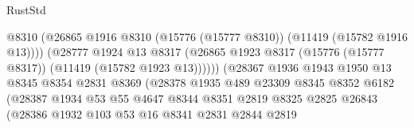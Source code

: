 \begin{lexlean}{RustStd}
\begin{coremodule}
                                            @8310
                                            (@26865
                                              @1916
                                              @8310
                                              (@15776 (@15777 @8310))
                                              (@11419 (@15782 @1916 @13))))
                                          (@28777
                                            @1924
                                            @13
                                            @8317
                                            (@26865
                                              @1923
                                              @8317
                                              (@15776 (@15777 @8317))
                                              (@11419 (@15782 @1923 @13))))))
                                      (@28367
                                        @1936
                                        @1943
                                        @1950
                                        @13
                                        @8345
                                        @8354
                                        @2831
                                        @8369
                                        (@28378
                                          @1935
                                          @489
                                          @23309
                                          @8345
                                          @8352
                                          @6182
                                          (@28387
                                            @1934
                                            @53
                                            @55
                                            @4647
                                            @8344
                                            @8351
                                            @2819
                                            @8325
                                            @2825
                                            @26843
                                            (@28386
                                              @1932
                                              @103
                                              @53
                                              @16
                                              @8341
                                              @2831
                                              @2844
                                              @2819

\end{coremodule}
\end{lexlean}
